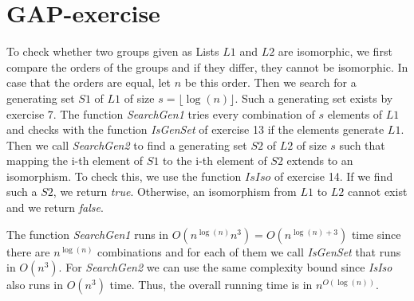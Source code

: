 \section{GAP-exercise}
To check whether two groups given as Lists $L1$ and $L2$ are isomorphic, we first compare the orders of the groups and if they differ, they cannot be isomorphic. In case that the orders are equal, let $n$ be this order. Then we search for a generating set $S1$ of $L1$ of size $s = \lfloor \log(n) \rfloor$. Such a generating set exists by exercise 7. The function \textit{SearchGen1} tries every combination of $s$ elements of $L1$ and checks with the function \textit{IsGenSet} of exercise 13 if the elements generate $L1$. Then we call \textit{SearchGen2} to find a generating set $S2$ of $L2$ of size $s$ such that mapping the i-th element of $S1$ to the i-th element of $S2$ extends to an isomorphism. To check this, we use the function $IsIso$ of exercise 14. If we find such a $S2$, we return \textit{true}. Otherwise, an isomorphism from $L1$ to $L2$ cannot exist and we return \textit{false}.



The function \textit{SearchGen1} runs in $O(n^{\log(n)} n^3) = O(n^{\log(n)+3})$ time since there are $n^{\log(n)}$ combinations and for each of them we call \textit{IsGenSet} that runs in $O(n^3)$. For \textit{SearchGen2} we can use the same complexity bound since \textit{IsIso} also runs in $O(n^3)$ time. Thus, the overall running time is in $n^{O(\log(n))}$.